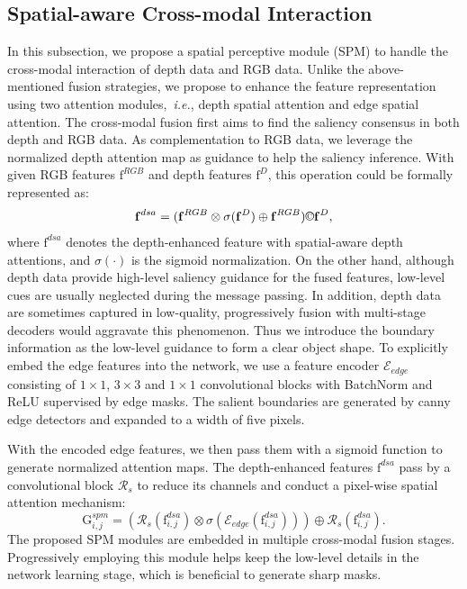 \documentclass[journal]{IEEEtran}
\def\ie{{\em i.e.}}
\newcommand{\mc}[1]{\mathcal{#1}}
\newcommand{\br}[1]{\bm{\mathrm{#1}}}
\begin{document}
\subsection{Spatial-aware Cross-modal Interaction}
In this subsection, we propose a spatial perceptive module (SPM) to handle the cross-modal interaction of depth data and RGB data.
Unlike the above-mentioned fusion strategies, we propose to enhance the feature representation using two attention modules,~\ie, depth spatial attention and edge spatial attention.
The cross-modal fusion first aims to find the saliency consensus in both depth and RGB data. As complementation to RGB data, we leverage the normalized depth attention map as guidance to help the saliency inference. With given RGB features $\br{f}^{RGB}$ and depth features $\br{f}^{D}$, this operation could be formally represented as:
\begin{equation} \label{eq:eq cmf 1}
\begin{split}
\br{f}^{dsa}= (\br{f}^{RGB} \otimes \sigma(\br{f}^{D}) \oplus \br{f}^{RGB})\copyright \br{f}^{D},
\end{split}
\end{equation}
where $\br{f}^{dsa}$ denotes the depth-enhanced feature with spatial-aware depth attentions, and $\sigma(\cdot)$ is the sigmoid normalization.
On the other hand, although depth data provide high-level saliency guidance for the fused features, low-level cues are usually neglected during the message passing. In addition, depth data are sometimes captured in low-quality, progressively fusion with multi-stage decoders would aggravate this phenomenon. Thus we introduce the boundary information as the low-level guidance to form a clear object shape. To explicitly embed the edge features into the network, we use a feature encoder $\mc{E}_{edge}$ consisting of $1\times1$, $3\times3$ and $1\times1$ convolutional blocks with BatchNorm and ReLU supervised by edge masks. The salient boundaries are generated by canny edge detectors and expanded to a width of five pixels.

With the encoded edge features, we then pass them with a sigmoid function to generate normalized attention maps. The depth-enhanced features $\br{f}^{dsa}$ pass by a convolutional block $\mc{R}_{s}$ to reduce its channels and conduct a pixel-wise spatial attention mechanism:
\begin{equation} \label{eq:eq cmf 2}
\br{G}^{spm}_{i,j} = (\mc{R}_{s}(\br{f}^{dsa}_{i,j}) \otimes \sigma(\mc{E}_{edge}(\br{f}^{dsa}_{i,j})))\oplus \mc{R}_{s}(\br{f}^{dsa}_{i,j}).
\end{equation}
The proposed SPM modules are embedded in multiple cross-modal fusion stages. Progressively employing this module helps keep the low-level details in the network learning stage, which is beneficial to generate sharp masks.
\end{document}
